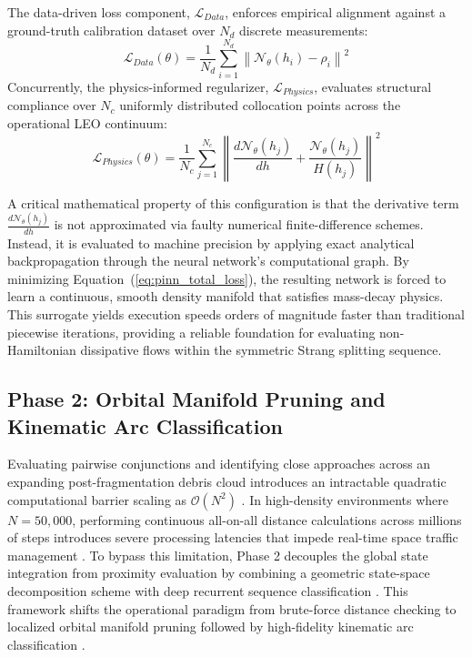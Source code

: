 \documentclass[letterpaper,11pt]{AAS}
\begin{document}
The data-driven loss component, $\mathcal{L}_{Data}$, enforces empirical alignment against a ground-truth calibration dataset over $N_d$ discrete measurements:
\begin{equation}
    \mathcal{L}_{Data}(\theta) = \frac{1}{N_d} \sum_{i=1}^{N_d} \left\| \mathcal{N}_\theta(h_i) - \rho_i \right\|^2
    \label{eq:l_data}
\end{equation}
Concurrently, the physics-informed regularizer, $\mathcal{L}_{Physics}$, evaluates structural compliance over $N_c$ uniformly distributed collocation points across the operational LEO continuum:
\begin{equation}
    \mathcal{L}_{Physics}(\theta) = \frac{1}{N_c} \sum_{j=1}^{N_c} \left\| \frac{d\mathcal{N}_\theta(h_j)}{dh} + \frac{\mathcal{N}_\theta(h_j)}{H(h_j)} \right\|^2
    \label{eq:l_physics}
\end{equation}

A critical mathematical property of this configuration is that the derivative term $\frac{d\mathcal{N}_\theta(h_j)}{dh}$ is not approximated via faulty numerical finite-difference schemes. Instead, it is evaluated to machine precision by applying exact analytical backpropagation through the neural network's computational graph. By minimizing Equation~(\ref{eq:pinn_total_loss}), the resulting network is forced to learn a continuous, smooth density manifold that satisfies mass-decay physics. This surrogate yields execution speeds orders of magnitude faster than traditional piecewise iterations, providing a reliable foundation for evaluating non-Hamiltonian dissipative flows within the symmetric Strang splitting sequence.

\subsection{Phase 2: Orbital Manifold Pruning and Kinematic Arc Classification}
\label{subsec:manifold_pruning_lstm}

Evaluating pairwise conjunctions and identifying close approaches across an expanding post-fragmentation debris cloud introduces an intractable quadratic computational barrier scaling as $\mathcal{O}(N^2)$ \cite{Abstract_AIAA_ASC_2026.pdf}. In high-density environments where $N = 50,000$, performing continuous all-on-all distance calculations across millions of steps introduces severe processing latencies that impede real-time space traffic management \cite{Abstract_AIAA_ASC_2026.pdf}. To bypass this limitation, Phase 2 decouples the global state integration from proximity evaluation by combining a geometric state-space decomposition scheme with deep recurrent sequence classification \cite{Abstract_AIAA_ASC_2026.pdf}. This framework shifts the operational paradigm from brute-force distance checking to localized orbital manifold pruning followed by high-fidelity kinematic arc classification \cite{Abstract_AIAA_ASC_2026.pdf}.
\end{document}
